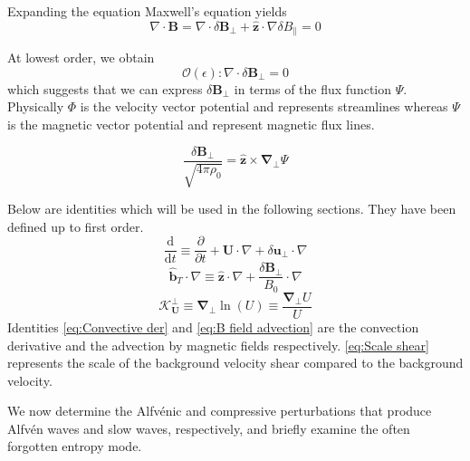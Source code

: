 Expanding the equation Maxwell's equation yields
\begin{equation*}
     \nabla \cdot \boldsymbol{B}= \nabla \cdot \delta \boldsymbol{B}_{\perp} + \hat{\boldsymbol{z}} \cdot\nabla \delta B_{\parallel} = 0
\end{equation*}

At lowest order, we obtain
\begin{equation}
    \mathcal{O}(\epsilon): \nabla \cdot \delta \boldsymbol{B}_{\perp} = 0
    \label{eq:Incomp b}
\end{equation}
which suggests that we can express \(\delta \boldsymbol{B}_{\perp}\) in terms of the flux function \(\Psi\). Physically \(\Phi\) is the velocity vector potential and represents streamlines whereas \(\Psi\) is the magnetic vector potential and represent magnetic flux lines.

\begin{equation}
    \frac{\delta\boldsymbol{B}_{\perp}}{\sqrt{4\pi \rho_{0}}}= \hat{\boldsymbol{z}} \times \boldsymbol{\nabla_{\perp}}\Psi
    \label{eq:Flux}
\end{equation}

Below are identities which will be used in the following sections. They have been defined up to first order. 
\begin{equation}
    \frac{\mathrm{d}}{\mathrm{d}t} \equiv \frac{\partial}{\partial t} + \boldsymbol{U} \cdot \nabla + \delta \boldsymbol{u}_{\perp} \cdot \nabla
    \label{eq:Convective der}
\end{equation}
\begin{equation}
    \hat{\boldsymbol{b}}_{T} \cdot \nabla \equiv \hat{\boldsymbol{z}} \cdot \nabla + \frac{\delta \boldsymbol{B}_{\perp}}{B_{0}} \cdot \nabla
    \label{eq:B field advection}
\end{equation}
\begin{equation}
     \boldsymbol{\mathcal{K}^{\perp}_{U}} \equiv \boldsymbol{\nabla_{\perp}} \ln(U) \equiv \frac{\boldsymbol{\nabla_{\perp}}U}{U} %
     \label{eq:Scale shear}
\end{equation}
Identities \eqref{eq:Convective der} and \eqref{eq:B field advection} are the convection derivative and the advection by magnetic fields respectively. \eqref{eq:Scale shear} represents the scale of the background velocity shear compared to the background velocity.

We now determine the Alfv\'enic and compressive perturbations that produce Alfv\'en waves and slow waves, respectively, and briefly examine the often forgotten entropy mode.

